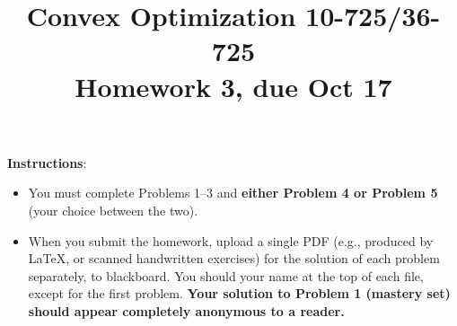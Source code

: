 \documentclass[12pt]{article}
\title{Convex Optimization 10-725/36-725 \\Homework 3, due Oct 17}
\date{}
\begin{document}
\maketitle

{\bf Instructions}: 
\begin{itemize}
\item
You must complete Problems 1--3 and {\bf either
Problem 4 or Problem 5} (your choice between the two). 
\item When you
submit the homework, upload a single PDF (e.g., produced by LaTeX,
or scanned handwritten exercises) for the solution of each problem 
separately, to blackboard. You should your name at the top of each 
file, except for the first problem. {\bf Your solution to Problem 1
(mastery set) should appear completely anonymous to a reader.}
\end{itemize}






\end{document}
